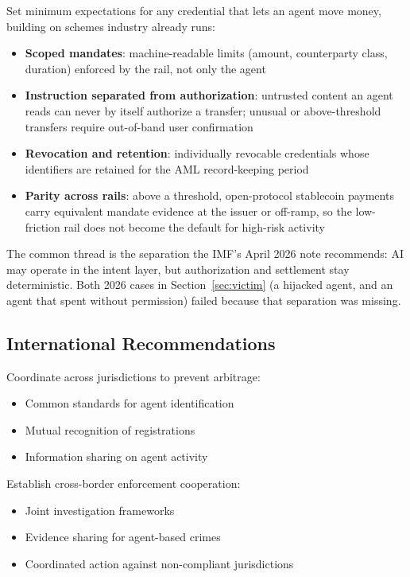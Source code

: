 \documentclass[11pt,letterpaper]{article}
\begin{document}
\begin{recbox}
Set minimum expectations for any credential that lets an agent move money, building on schemes industry already runs:
\begin{itemize}
  \item \textbf{Scoped mandates}: machine-readable limits (amount, counterparty class, duration) enforced by the rail, not only the agent
  \item \textbf{Instruction separated from authorization}: untrusted content an agent reads can never by itself authorize a transfer; unusual or above-threshold transfers require out-of-band user confirmation
  \item \textbf{Revocation and retention}: individually revocable credentials whose identifiers are retained for the AML record-keeping period
  \item \textbf{Parity across rails}: above a threshold, open-protocol stablecoin payments carry equivalent mandate evidence at the issuer or off-ramp, so the low-friction rail does not become the default for high-risk activity
\end{itemize}
The common thread is the separation the IMF's April 2026 note recommends: AI may operate in the intent layer, but authorization and settlement stay deterministic. Both 2026 cases in Section~\ref{sec:victim} (a hijacked agent, and an agent that spent without permission) failed because that separation was missing.
\end{recbox}

\subsection{International Recommendations}
\label{sec:recs-intl}


\begin{recbox}
Coordinate across jurisdictions to prevent arbitrage:
\begin{itemize}
  \item Common standards for agent identification
  \item Mutual recognition of registrations
  \item Information sharing on agent activity
\end{itemize}
\end{recbox}

\begin{recbox}
Establish cross-border enforcement cooperation:
\begin{itemize}
  \item Joint investigation frameworks
  \item Evidence sharing for agent-based crimes
  \item Coordinated action against non-compliant jurisdictions
\end{itemize}
\end{recbox}
\end{document}
